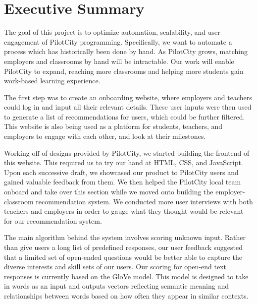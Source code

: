 
\chapter{Executive Summary}%
\label{sec:executive-summary}


The goal of this project is to optimize automation, scalability, and user engagement of PilotCity programming. Specifically, we want to automate a process which has historically been done by hand. As PilotCity grows, matching employers and classrooms by hand will be intractable. Our work will enable PilotCity to expand, reaching more classrooms and helping more students gain work-based learning experience. 

	The first step was to create an onboarding website, where employers and teachers could log in and input all their relevant details. These user inputs were then used to generate a list of recommendations for users, which could be further filtered. This website is also being used as a platform for students, teachers, and employers to engage with each other, and look at their milestones.
	
	Working off of designs provided by PilotCity, we started building the frontend of this website. This required us to try our hand at HTML, CSS, and JavaScript. Upon each successive draft, we showcased our product to PilotCity users and gained valuable feedback from them. We then helped the PilotCity local team onboard and take over this section while we moved onto building the employer-classroom recommendation system. We conducted more user interviews with both teachers and employers in order to gauge what they thought would be relevant for our recommendation system. 
	
	The main algorithm behind the system involves scoring unknown input. Rather than give users a long list of predefined responses, our user feedback suggested that a limited set of open-ended questions would be better able to capture the diverse interests and skill sets of our users. Our scoring for open-end text responses is currently based on the GloVe model. This model is designed to take in words as an input and outputs vectors reflecting semantic meaning and relationships between words based on how often they appear in similar contexts. 
	

